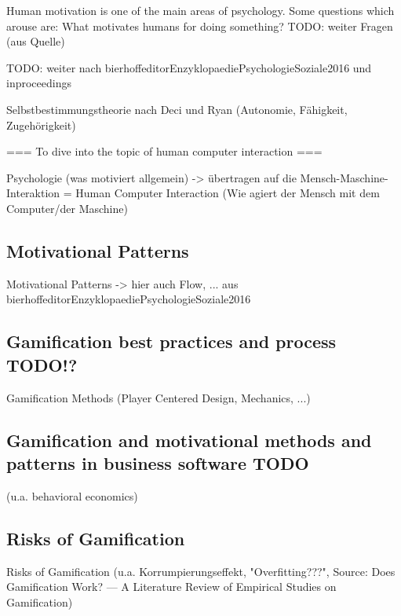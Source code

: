 Human motivation is one of the main areas of psychology. Some questions which arouse are: What motivates humans for doing something? TODO: weiter Fragen (aus Quelle) \cite[p. 1]{bierhoffeditorEnzyklopaediePsychologieSoziale2016}

TODO: weiter nach bierhoffeditorEnzyklopaediePsychologieSoziale2016
und inproceedings

Selbstbestimmungstheorie nach Deci und Ryan (Autonomie, Fähigkeit, Zugehörigkeit)

===
To dive into the topic of human computer interaction 
===

Psychologie (was motiviert allgemein) -> übertragen auf die Mensch-Maschine-Interaktion = Human Computer Interaction (Wie agiert der Mensch mit dem Computer/der Maschine)

\subsection{Motivational Patterns}
\label{sec:theorieBc}
Motivational Patterns
-> hier auch Flow, ... aus bierhoffeditorEnzyklopaediePsychologieSoziale2016

\subsection{Gamification best practices and process TODO!?}
\label{sec:theorieBd}
Gamification Methods (Player Centered Design, Mechanics, ...)

\subsection{Gamification and motivational methods and patterns in business software TODO}
\label{sec:theorieBe}
(u.a. behavioral economics)

\subsection{Risks of Gamification}
\label{sec:theorieBf}
Risks of Gamification (u.a. Korrumpierungseffekt, "Overfitting???", Source: Does Gamification Work? — A Literature Review of Empirical Studies on
Gamification)


\newpage
